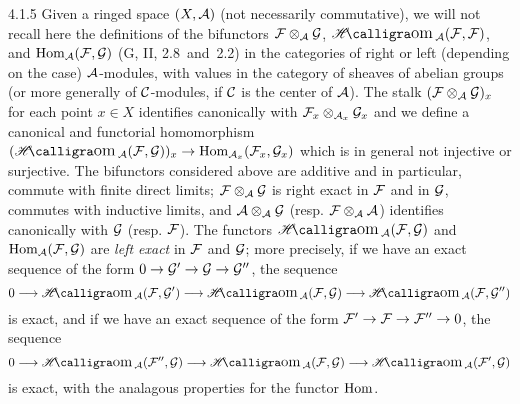 \begin{env}{4.1.5}
Given a ringed space $(X,\mathcal{A})$ (not necessarily commutative), we will not recall here the definitions of the
bifunctors $\mathcal{F}\otimes_{\mathcal{A}}\mathcal{G}$, $\sheafHom_{\sheaf{A}}(\sheaf{F},\sheaf{F})$, and
$\operatorname{Hom}_{\mathcal{A}}(\mathcal{F},\mathcal{G})$ (G, II, 2.8~and~2.2) in the categories of right or left (depending on
the case) $\mathcal{A}$-modules, with values in the category of sheaves of abelian groups (or more generally
of $\mathcal{C}$-modules, if $\mathcal{C}$ is the center of $\mathcal{A}$). The stalk $(\mathcal{F}\otimes_{\mathcal{A}}\mathcal{G})_x$
for each point $x\in X$ identifies canonically with $\mathcal{F}_x\otimes_{\mathcal{A}_x}\mathcal{G}_x$ and we define a
canonical and functorial homomorphism $(\sheafHom_{\sheaf{A}}(\sheaf{F},\sheaf{G}))_x\to\Hom_{\sheaf{A}_x}(\sheaf{F}_x,\sheaf{G}_x)$
which is in general not injective or surjective. The bifunctors considered above are additive and in particular,
commute with finite direct limits; $\mathcal{F}\otimes_{\mathcal{A}}\mathcal{G}$ is right exact in $\mathcal{F}$ and in $\mathcal{G}$,
commutes with inductive limits, and $\mathcal{A}\otimes_{\mathcal{A}}\mathcal{G}$ (resp. $\mathcal{F}\otimes_{\mathcal{A}}\mathcal{A}$)
identifies canonically with $\mathcal{G}$ (resp. $\mathcal{F}$). The functors $\sheafHom_{\sheaf{A}}(\sheaf{F},\sheaf{G})$ and
$\operatorname{Hom}_{\mathcal{A}}(\mathcal{F},\mathcal{G})$ are \emph{left exact} in $\mathcal{F}$ and $\mathcal{G}$; more precisely,
if we have an exact sequence of the form $0\to\mathcal{G}'\to\mathcal{G}\to\mathcal{G}''$, the sequence
\[
  0\longrightarrow\sheafHom_{\sheaf{A}}(\sheaf{F},\sheaf{G}')\longrightarrow
  \sheafHom_{\sheaf{A}}(\sheaf{F},\sheaf{G})\longrightarrow\sheafHom_{\sheaf{A}}(\sheaf{F},\sheaf{G}'')
\]
is exact, and if we have an exact sequence of the form $\mathcal{F}'\to\mathcal{F}\to\mathcal{F}''\to 0$, the sequence
\[
  0\longrightarrow\sheafHom_{\sheaf{A}}(\sheaf{F}'',\sheaf{G})\longrightarrow
  \sheafHom_{\sheaf{A}}(\sheaf{F},\sheaf{G})\longrightarrow\sheafHom_{\sheaf{A}}(\sheaf{F}',\sheaf{G})
\]
is exact, with the analagous properties for the functor $\operatorname{Hom}$.
\end{env}


